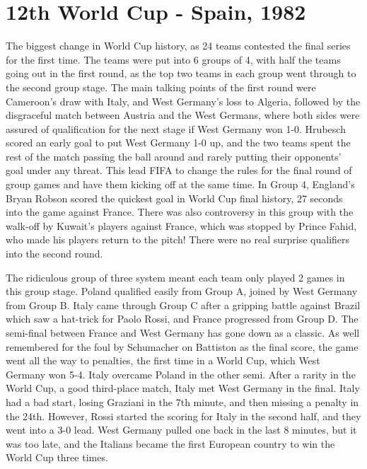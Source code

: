 \section{12th World Cup - Spain, 1982}
The biggest change in World Cup history, as 24 teams contested the final series
for the first time. The teams were put into 6 groups of 4, with half the teams 
going out in the first round, as the top two teams in each group went through 
to the second group stage. The main talking points of the first round were 
Cameroon's draw with Italy, and West Germany's loss to Algeria, followed by the
disgraceful match between Austria and the West Germans, where both sides were 
assured of qualification for the next stage if West Germany won 1-0. Hrubesch
scored an early goal to put West Germany 1-0 up, and the two teams spent the 
rest of the match passing the ball around and rarely putting their opponents'
goal under any threat. This lead FIFA to change the rules for the final round
of group games and have them kicking off at the same time. In Group 4, 
England's Bryan Robson scored the quickest goal in World Cup final history, 27 
seconds into the game against France. There was also controversy in this group 
with the walk-off by Kuwait's players against France, which was stopped by 
Prince Fahid, who made his players return to the pitch! There were no real 
surprise qualifiers into the second round.

The ridiculous group of three system meant each team only played 2 games in 
this group stage. Poland qualified easily from Group A, joined by West Germany
from Group B. Italy came through Group C after a gripping battle against Brazil
which saw a hat-trick for Paolo Rossi, and France progressed from Group D. The
semi-final between France and West Germany has gone down as a classic. As well
remembered for the foul by Schumacher on Battiston as the final score, the game
went all the way to penalties, the first time in a World Cup, which West 
Germany won 5-4. Italy overcame Poland in the other semi. After a rarity in the
World Cup, a good third-place match, Italy met West Germany in the final. Italy
had a bad start, losing Graziani in the 7th minute, and then missing a penalty 
in the 24th. However, Rossi started the scoring for Italy in the second half, 
and they went into a 3-0 lead. West Germany pulled one back in the last 8 
minutes, but it was too late, and the Italians became the first European 
country to win the World Cup three times.
